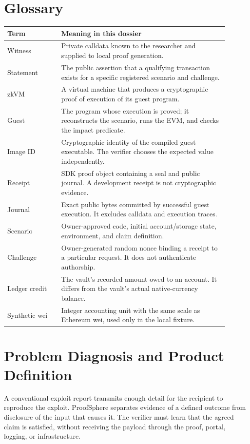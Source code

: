 \documentclass[11pt]{article}
\begin{document}
\section{Glossary}
\begin{longtable}{L{0.22\linewidth}L{0.68\linewidth}}
\toprule
\textbf{Term} & \textbf{Meaning in this dossier} \\
\midrule
\endhead
Witness & Private calldata known to the researcher and supplied to local proof generation. \\
Statement & The public assertion that a qualifying transaction exists for a specific registered scenario and challenge. \\
zkVM & A virtual machine that produces a cryptographic proof of execution of its guest program. \\
Guest & The program whose execution is proved; it reconstructs the scenario, runs the EVM, and checks the impact predicate. \\
Image ID & Cryptographic identity of the compiled guest executable. The verifier chooses the expected value independently. \\
Receipt & SDK proof object containing a seal and public journal. A development receipt is not cryptographic evidence. \\
Journal & Exact public bytes committed by successful guest execution. It excludes calldata and execution traces. \\
Scenario & Owner-approved code, initial account/storage state, environment, and claim definition. \\
Challenge & Owner-generated random nonce binding a receipt to a particular request. It does not authenticate authorship. \\
Ledger credit & The vault's recorded amount owed to an account. It differs from the vault's actual native-currency balance. \\
Synthetic wei & Integer accounting unit with the same scale as Ethereum wei, used only in the local fixture. \\
\bottomrule
\end{longtable}

\section{Problem Diagnosis and Product Definition}
A conventional exploit report transmits enough detail for the recipient to reproduce the exploit. ProofSphere separates evidence of a defined outcome from disclosure of the input that causes it. The verifier must learn that the agreed claim is satisfied, without receiving the payload through the proof, portal, logging, or infrastructure.
\end{document}
